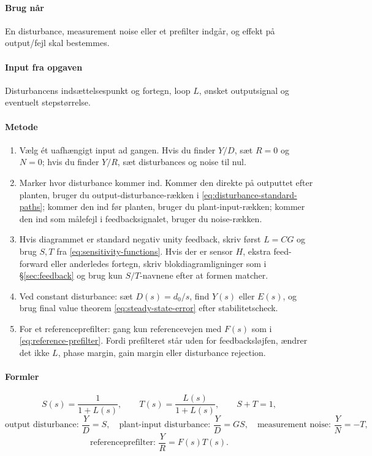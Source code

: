 \paragraph{Brug når}
En disturbance, measurement noise eller et prefilter indgår, og effekt på output/fejl
skal bestemmes.

\paragraph{Input fra opgaven}
Disturbancens indsættelsespunkt og fortegn, loop \(L\), ønsket outputsignal og eventuelt
stepstørrelse.

\paragraph{Metode}
\begin{enumerate}
\item Vælg ét uafhængigt input ad gangen. Hvis du finder \(Y/D\), sæt \(R=0\) og
      \(N=0\); hvis du finder \(Y/R\), sæt disturbances og noise til nul.
\item Marker hvor disturbance kommer ind. Kommer den direkte på outputtet efter
      planten, bruger du output-disturbance-rækken i \eqref{eq:disturbance-standard-paths};
      kommer den ind før planten, bruger du plant-input-rækken; kommer den ind som
      målefejl i feedbacksignalet, bruger du noise-rækken.
\item Hvis diagrammet er standard negativ unity feedback, skriv først \(L=CG\) og brug
      \(S,T\) fra \eqref{eq:sensitivity-functions}. Hvis der er sensor \(H\), ekstra
      feed-forward eller anderledes fortegn, skriv blokdiagramligninger som i
      \S\ref{sec:feedback} og brug kun \(S/T\)-navnene efter at formen matcher.
\item Ved constant disturbance: sæt \(D(s)=d_0/s\), find \(Y(s)\) eller \(E(s)\), og
      brug final value theorem \eqref{eq:steady-state-error} efter stabilitetscheck.
\item For et referenceprefilter: gang kun referencevejen med \(F(s)\) som i
      \eqref{eq:reference-prefilter}. Fordi prefilteret står uden for feedbacksløjfen,
      ændrer det ikke \(L\), phase margin, gain margin eller disturbance rejection.
\end{enumerate}

\paragraph{Formler}
\begin{equation}
\label{eq:sensitivity-functions}
S(s)=\frac1{1+L(s)},\qquad T(s)=\frac{L(s)}{1+L(s)},\qquad S+T=1,
\end{equation}
\begin{equation}
\label{eq:disturbance-standard-paths}
\text{output disturbance: } \frac{Y}{D}=S,\quad
\text{plant-input disturbance: } \frac{Y}{D}=GS,\quad
\text{measurement noise: } \frac{Y}{N}=-T,
\end{equation}
\begin{equation}
\label{eq:reference-prefilter}
\text{referenceprefilter: }\frac{Y}{R}=F(s)T(s).
\end{equation}

